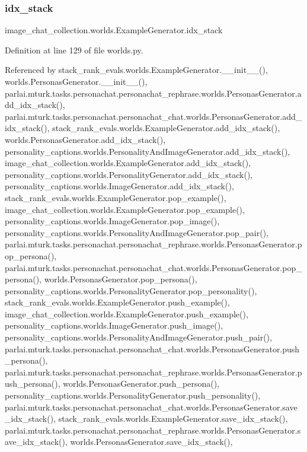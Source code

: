 \subsubsection{\texorpdfstring{idx\+\_\+stack}{idx\_stack}}
{\footnotesize\ttfamily image\+\_\+chat\+\_\+collection.\+worlds.\+Example\+Generator.\+idx\+\_\+stack}



Definition at line 129 of file worlds.\+py.



Referenced by stack\+\_\+rank\+\_\+evals.\+worlds.\+Example\+Generator.\+\_\+\+\_\+init\+\_\+\+\_\+(), worlds.\+Personas\+Generator.\+\_\+\+\_\+init\+\_\+\+\_\+(), parlai.\+mturk.\+tasks.\+personachat.\+personachat\+\_\+rephrase.\+worlds.\+Personas\+Generator.\+add\+\_\+idx\+\_\+stack(), parlai.\+mturk.\+tasks.\+personachat.\+personachat\+\_\+chat.\+worlds.\+Personas\+Generator.\+add\+\_\+idx\+\_\+stack(), stack\+\_\+rank\+\_\+evals.\+worlds.\+Example\+Generator.\+add\+\_\+idx\+\_\+stack(), worlds.\+Personas\+Generator.\+add\+\_\+idx\+\_\+stack(), personality\+\_\+captions.\+worlds.\+Personality\+And\+Image\+Generator.\+add\+\_\+idx\+\_\+stack(), image\+\_\+chat\+\_\+collection.\+worlds.\+Example\+Generator.\+add\+\_\+idx\+\_\+stack(), personality\+\_\+captions.\+worlds.\+Personality\+Generator.\+add\+\_\+idx\+\_\+stack(), personality\+\_\+captions.\+worlds.\+Image\+Generator.\+add\+\_\+idx\+\_\+stack(), stack\+\_\+rank\+\_\+evals.\+worlds.\+Example\+Generator.\+pop\+\_\+example(), image\+\_\+chat\+\_\+collection.\+worlds.\+Example\+Generator.\+pop\+\_\+example(), personality\+\_\+captions.\+worlds.\+Image\+Generator.\+pop\+\_\+image(), personality\+\_\+captions.\+worlds.\+Personality\+And\+Image\+Generator.\+pop\+\_\+pair(), parlai.\+mturk.\+tasks.\+personachat.\+personachat\+\_\+rephrase.\+worlds.\+Personas\+Generator.\+pop\+\_\+persona(), parlai.\+mturk.\+tasks.\+personachat.\+personachat\+\_\+chat.\+worlds.\+Personas\+Generator.\+pop\+\_\+persona(), worlds.\+Personas\+Generator.\+pop\+\_\+persona(), personality\+\_\+captions.\+worlds.\+Personality\+Generator.\+pop\+\_\+personality(), stack\+\_\+rank\+\_\+evals.\+worlds.\+Example\+Generator.\+push\+\_\+example(), image\+\_\+chat\+\_\+collection.\+worlds.\+Example\+Generator.\+push\+\_\+example(), personality\+\_\+captions.\+worlds.\+Image\+Generator.\+push\+\_\+image(), personality\+\_\+captions.\+worlds.\+Personality\+And\+Image\+Generator.\+push\+\_\+pair(), parlai.\+mturk.\+tasks.\+personachat.\+personachat\+\_\+chat.\+worlds.\+Personas\+Generator.\+push\+\_\+persona(), parlai.\+mturk.\+tasks.\+personachat.\+personachat\+\_\+rephrase.\+worlds.\+Personas\+Generator.\+push\+\_\+persona(), worlds.\+Personas\+Generator.\+push\+\_\+persona(), personality\+\_\+captions.\+worlds.\+Personality\+Generator.\+push\+\_\+personality(), parlai.\+mturk.\+tasks.\+personachat.\+personachat\+\_\+chat.\+worlds.\+Personas\+Generator.\+save\+\_\+idx\+\_\+stack(), stack\+\_\+rank\+\_\+evals.\+worlds.\+Example\+Generator.\+save\+\_\+idx\+\_\+stack(), parlai.\+mturk.\+tasks.\+personachat.\+personachat\+\_\+rephrase.\+worlds.\+Personas\+Generator.\+save\+\_\+idx\+\_\+stack(), worlds.\+Personas\+Generator.\+save\+\_\+idx\+\_\+stack(), 